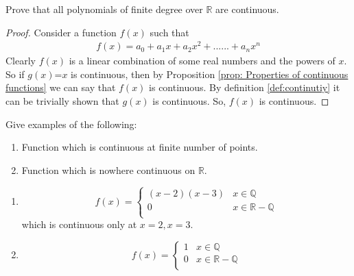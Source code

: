 \documentclass[journal,12pt,twocolumn]{IEEEtran}
\begin{document}
\begin{problem}
Prove that all polynomials of finite degree over $\mathbb{R}$ are continuous.
\end{problem}
\begin{proof}
Consider a function $f(x)$ such that
\begin{align}
f(x)=a_0+a_1x+a_2x^2+......+a_nx^n
\end{align}
Clearly $f(x)$ is a linear combination of some real numbers and the powers of $x$.
So if $g(x)$=$x$ is continuous, then by Proposition \ref{prop: Properties of continuous functions} we can say that $f(x)$ is continuous.
By definition \ref{def:continutiy} it can be trivially shown that $g(x)$ is continuous. So, $f(x)$ is continuous. 
\end{proof}
%
\begin{problem}
Give examples of the following:
\begin{enumerate}
\item Function which is continuous at finite number of points.
\item Function which is nowhere continuous on $\mathbb{R}$.
\end{enumerate}
\end{problem}
\solution
\begin{enumerate}
\item \begin{equation}
f(x)=
 \begin{cases} 
      (x-2)(x-3) & x\in\mathbb{Q} \\
      0 & x\in\mathbb{R}-\mathbb{Q} \\ 
   \end{cases}
\end{equation}
which is continuous only at $x=2,x=3$.

\item
\begin{equation}
f(x)= \begin{cases} 
      1 & x\in\mathbb{Q} \\
      0 & x\in\mathbb{R}-\mathbb{Q} \\ 
   \end{cases}
\end{equation}

\end{enumerate}
\end{document}
